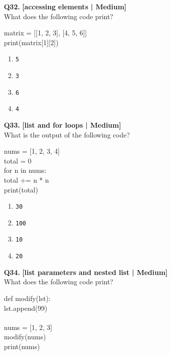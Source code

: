 \noindent\textbf{Q32.} \hfill {\small\color{LPUOrange}\textbf{[accessing elements | Medium]}}\\[2pt]
What does the following code print? 

\begin{pycode}
matrix = [[1, 2, 3], [4, 5, 6]]\\
print(matrix[1][2])
\end{pycode}

\begin{enumerate}[label=(\alph*),topsep=2pt,itemsep=1pt,partopsep=0pt,parsep=0pt]
    \item \relax \texttt{5}
    \item \relax \texttt{3}
    \item \relax \texttt{6}
    \item \relax \texttt{4}
\end{enumerate}
\vspace{2mm}

\noindent\textbf{Q33.} \hfill {\small\color{LPUOrange}\textbf{[list and for loops | Medium]}}\\[2pt]
What is the output of the following code? 

\begin{pycode}
nums = [1, 2, 3, 4]\\
total = 0\\
for n in nums:\\
total += n * n\\
print(total)
\end{pycode}

\begin{enumerate}[label=(\alph*),topsep=2pt,itemsep=1pt,partopsep=0pt,parsep=0pt]
    \item \relax \texttt{30}
    \item \relax \texttt{100}
    \item \relax \texttt{10}
    \item \relax \texttt{20}
\end{enumerate}
\vspace{2mm}

\noindent\textbf{Q34.} \hfill {\small\color{LPUOrange}\textbf{[list parameters and nested list | Medium]}}\\[2pt]
What does the following code print? 

\begin{pycode}
def modify(lst):\\
lst.append(99)\\
~\\
nums = [1, 2, 3]\\
modify(nums)\\
print(nums)
\end{pycode}


